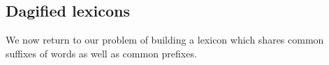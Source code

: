 \subsection{Dagified lexicons}

We now return to our problem of building a lexicon which shares
common suffixes of words as well as common prefixes.
